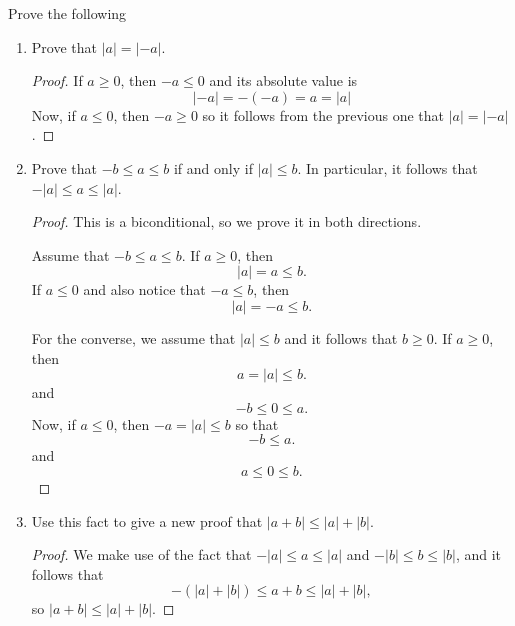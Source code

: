 \begin{exercise}[\textbf{14}] Prove the following
     \begin{enumerate}
        \item Prove that $|a|=|-a|$.
        \begin{proof} If $a \geq 0$, then $-a \leq 0$ and its absolute value is
             \begin{equation*}
                 |-a| = -(-a) = a = |a|
             \end{equation*}
             Now, if $a \leq 0$, then $-a \geq 0$ so it follows from the
             previous one that $|a|=|-a|$.
        \end{proof}
        \item Prove that $-b \leq a \leq b$ if and only if $|a| \leq b$. In
        particular, it follows that $-|a| \leq a \leq |a|$.
        \begin{proof} This is a biconditional, so we prove it in both directions.
             
            Assume that $-b \leq a \leq b$. If $a \geq 0$, then 
            \begin{equation*}
                |a| = a \leq b.
            \end{equation*}
            If $a \leq 0$ and also notice that $-a \leq b$, then
            \begin{equation*}
                |a|=-a \leq b.
            \end{equation*}

            For the converse, we assume that $|a|\leq b$ and it follows that $b\geq0$. If $a\geq 0$, then
            \begin{equation*}
                a=|a|\leq b.
            \end{equation*}   
            and 
            \begin{equation*}
                -b \leq 0 \leq a.
            \end{equation*}
            Now, if $a\leq 0$, then $-a = |a|\leq b$ so that 
            \begin{equation*}
                -b \leq a.
            \end{equation*}
            and
            \begin{equation*}
                a \leq 0 \leq b.
            \end{equation*}
        \end{proof}
        \item Use this fact to give a new proof that $|a+b| \leq |a|+|b|$.
        \begin{proof} We make use of the fact that $-|a| \leq a \leq |a|$ and
        $-|b| \leq b \leq |b|$, and it follows that
             \begin{equation*}
                 -(|a|+|b|) \leq a+b \leq |a|+|b|,
             \end{equation*}
             so $|a+b| \leq |a| + |b|$.
        \end{proof}
     \end{enumerate}
\end{exercise}

